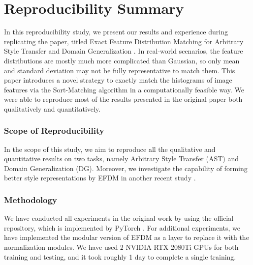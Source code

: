 \section*{\centering Reproducibility Summary}

In this reproducibility study, we present our results and experience during replicating the paper, titled Exact Feature Distribution Matching for Arbitrary Style Transfer and Domain Generalization \cite{zhang2021exact}. In real-world scenarios, the feature distributions are mostly much more complicated than Gaussian, so only mean and standard deviation may not be fully representative to match them. This paper introduces a novel strategy to exactly match the histograms of image features via the Sort-Matching algorithm in a computationally feasible way. We were able to reproduce most of the results presented in the original paper both qualitatively and quantitatively.

\subsubsection*{Scope of Reproducibility}

In the scope of this study, we aim to reproduce all the qualitative and quantitative results on two tasks, namely Arbitrary Style Transfer (AST) and Domain Generalization (DG). Moreover, we investigate the capability of forming better style representations by EFDM in another recent study \cite{kinli2023modeling}.

\subsubsection*{Methodology}

We have conducted all experiments in the original work by using the official repository, which is implemented by PyTorch \cite{paszke2017automatic}. For additional experiments, we have implemented the modular version of EFDM as a layer to replace it with the normalization modules. We have used 2 NVIDIA RTX 2080Ti GPUs for both training and testing, and it took roughly 1 day to complete a single training.
 
